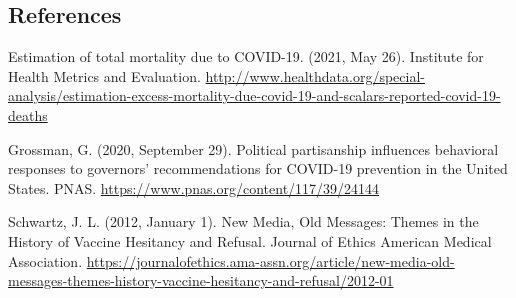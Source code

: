 \documentclass[
]{article}
\begin{document}
\hypertarget{references}{%
\subsection{References}\label{references}}

Estimation of total mortality due to COVID-19. (2021, May 26). Institute
for Health Metrics and Evaluation.
\url{http://www.healthdata.org/special-analysis/estimation-excess-mortality-due-covid-19-and-scalars-reported-covid-19-deaths}

Grossman, G. (2020, September 29). Political partisanship influences
behavioral responses to governors' recommendations for COVID-19
prevention in the United States. PNAS.
\url{https://www.pnas.org/content/117/39/24144}

Schwartz, J. L. (2012, January 1). New Media, Old Messages: Themes in
the History of Vaccine Hesitancy and Refusal. Journal of Ethics
\textbar{} American Medical Association.
\url{https://journalofethics.ama-assn.org/article/new-media-old-messages-themes-history-vaccine-hesitancy-and-refusal/2012-01}
\end{document}
